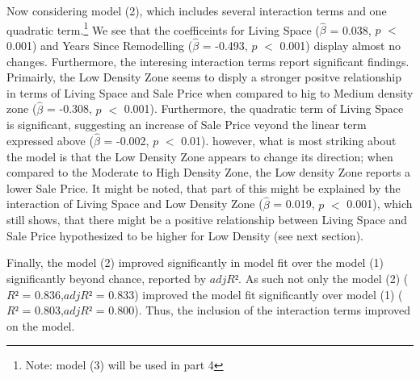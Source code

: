 \documentclass[a4paper]{article}
\begin{document}
\indent Now considering model (2), which includes several interaction terms and one quadratic term.\footnote{Note: model (3) will be used in part 4} We see that the coefficeints for Living Space ($\hat{\beta}$ = 0.038, $p$ $<$ 0.001) and Years Since Remodelling ($\hat{\beta}$ = -0.493, $p$ $<$ 0.001) display almost no changes. Furthermore, the interesing interaction terms report significant findings. Primairly, the Low Density Zone seems to disply a stronger positve relationship in terms of Living Space and Sale Price when compared to hig to Medium density zone ($\hat{\beta}$ = -0.308, $p$ $<$ 0.001). Furthermore, the quadratic term of Living Space is significant, suggesting an increase of Sale Price veyond the linear term expressed above ($\hat{\beta}$ = -0.002, $p$ $<$ 0.01). however, what is most striking about the model is that the Low Density Zone appears to change its direction; when compared to the Moderate to High Density Zone, the Low density Zone reports a lower Sale Price. It might be noted, that part of this might be explained by the interaction of Living Space and Low Density Zone ($\hat{\beta}$ = 0.019, $p$ $<$ 0.001), which still shows, that there might be a positive relationship between Living Space and Sale Price hypothesized to be higher for Low Density (see next section).

Finally, the model (2) improved significantly in model fit over the model (1) significantly beyond chance, reported by $adjR²$. As such not only the model (2) ($R²$ = 0.836,$adjR²$ = 0.833) improved the model fit significantly over model (1) ($R²$ = 0.803,$adjR²$ = 0.800). Thus, the inclusion of the interaction terms improved on the model.
\end{document}
